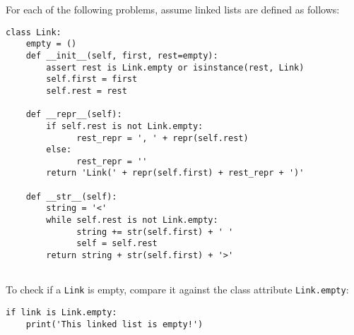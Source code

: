 \begin{blocksection}
For each of the following problems, assume linked lists are defined as follows:
\newline
\begin{lstlisting}
class Link:
    empty = ()
    def __init__(self, first, rest=empty):
        assert rest is Link.empty or isinstance(rest, Link)
        self.first = first
        self.rest = rest

    def __repr__(self):
        if self.rest is not Link.empty:
              rest_repr = ', ' + repr(self.rest)
        else:
              rest_repr = ''
        return 'Link(' + repr(self.first) + rest_repr + ')'

    def __str__(self):
        string = '<'
        while self.rest is not Link.empty:
              string += str(self.first) + ' '
              self = self.rest
        return string + str(self.first) + '>'
        
\end{lstlisting}
\vspace{\baselineskip}
To check if a \texttt{Link} is empty, compare it against the class attribute \texttt{Link.empty}:
\newline
\begin{lstlisting}
if link is Link.empty:
    print('This linked list is empty!')
\end{lstlisting}
\end{blocksection}
